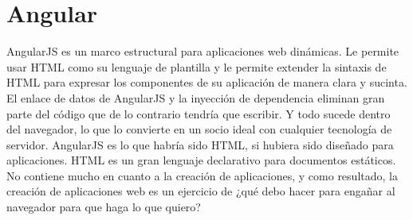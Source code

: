     \section{Angular}
    AngularJS es un marco estructural para aplicaciones web dinámicas. Le permite usar HTML como su lenguaje de plantilla y le permite extender la sintaxis de HTML para expresar los componentes de su aplicación de manera clara y sucinta. El enlace de datos de AngularJS y la inyección de dependencia eliminan gran parte del código que de lo contrario tendría que escribir. Y todo sucede dentro del navegador, lo que lo convierte en un socio ideal con cualquier tecnología de servidor.
    AngularJS es lo que habría sido HTML, si hubiera sido diseñado para aplicaciones. HTML es un gran lenguaje declarativo para documentos estáticos. No contiene mucho en cuanto a la creación de aplicaciones, y como resultado, la creación de aplicaciones web es un ejercicio de ¿qué debo hacer para engañar al navegador para que haga lo que quiero?
